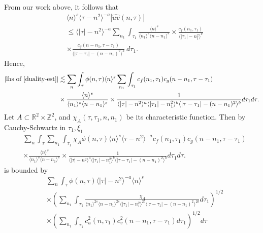 \documentclass[12pt,reqno]{amsart}
\numberwithin{equation}{section}  %
\renewcommand{\cref}{\Cref}
\newcommand{\rr}{\mathbb{R}}
\newcommand{\zz}{\mathbb{Z}}
\newcommand{\wh}{\widehat}
\begin{document}
%
%
From our work above, it follows that 
%
%
\begin{equation}
	\label{convo-est-starting-pnt}
	\begin{split}
		 & \langle n \rangle^s \langle \tau - n^{2} \rangle^{-a} | \wh{uv}\left( 
		n, \tau \right) |
		\\
		& \le \langle |\tau| - n^{2} \rangle^{-a}
		\sum_{n_{1}} \int_{\tau_{1}} \frac{\langle n \rangle^{s}}{\langle n_1 \rangle^s
    \langle n - n_1 \rangle^s} 
		\times \frac{c_f(n_1, \tau_1)}{\langle |\tau_1| - n_1^{2} \rangle ^{b}}
		\\
		& \times
		\frac{c_g(n - n_1, \tau - \tau_1 )}{\langle |\tau - \tau_1| - (n - n_1)^{2}
    \rangle^{b}}\ d \tau_1.
	\end{split}
\end{equation}
%
%
Hence, 
%
%
\begin{equation}
  \label{pre-fubini-int-form}
	\begin{split}
    |\text{lhs of} \ \cref{duality-est}|
	& \lesssim \sum_{n} \int_{\tau} \phi(n, \tau) \langle n \rangle^s 
  \sum_{n_{1}}
  \int_{\tau_{1}} c_f(n_1, \tau_1)
		c_g(n - n_1, \tau - \tau_1 )
		\\
    & \times \frac{\langle n \rangle ^{s}}{\langle n_{1} \rangle ^{s} \langle
    n-n_{1} \rangle ^{s}} \times \frac{1}{\langle |\tau| - n^{2} \rangle
    ^{a}\langle |\tau_{1}|-n_{1}^{2} \rangle ^{b}\langle | \tau -
    \tau_{1}|-(n - n_{1})^{2}
    \rangle ^{b}} d \tau_1 d \tau.
	\end{split}
\end{equation}
%
Let $A \subset \rr^{2} \times \zz^{2}$, and $\chi_{A}(\tau, \tau_{1}, n, n_{1})$
be its
characteristic function. Then by Cauchy-Schwartz in
$\tau_{1}, \xi_{1}$
\begin{equation*}
	\begin{split}
    & \sum_{n} \int_{\tau}   \sum_{n_{1}}
    \int_{\tau_{1}} \chi_{A}
    \phi(n, \tau) \langle n \rangle^s \langle \tau - n^{2} \rangle^{-a}
  c_f(n_1, \tau_1)
		c_g(n - n_1, \tau - \tau_1 )
		\\
    & \times \frac{\langle n \rangle ^{s}}{\langle n_{1} \rangle ^{s} \langle
    n-n_{1} \rangle ^{s}} \times \frac{1}{\langle |\tau| - n^{2} \rangle
    ^{a}\langle |\tau_{1}|-n_{1}^{2} \rangle ^{b}\langle | \tau -
    \tau_{1}|-(n - n_{1})^{2}
    \rangle ^{b}} d \tau_1 d \tau.
	\end{split}
\end{equation*}
%
is bounded by 
%
%
\begin{equation}
	\label{10g}
	\begin{split}
    & \sum_{n} \int_{\tau} \phi(n, \tau) \langle | \tau | - n^{2} \rangle
    ^{-a} \langle n \rangle ^{s}
    \\
    & \times \left( \sum_{n_{1}} \int_{\tau_{1}}
    \frac{\chi_{A}}{\langle n_{1} \rangle ^{2s} \langle n-n_{1} \rangle ^{2s} \langle |
    \tau_{1} | - n_{1}^{2}\rangle^{2b}  \langle | \tau - \tau_{1} | -
    (n - n_{1})^{2} \rangle^{2b} } d \tau_{1} \right)^{1/2}
    \\
    & \times \left( \sum_{n_{1}} \int_{\tau_{1}} c_{u}^{2}(n, \tau_{1})
    c_{v}^{2}(n - n_{1}, \tau - \tau_{1}) d \tau_{1} \right)^{1/2} d \tau
  \end{split}
\end{equation}
\end{document}
